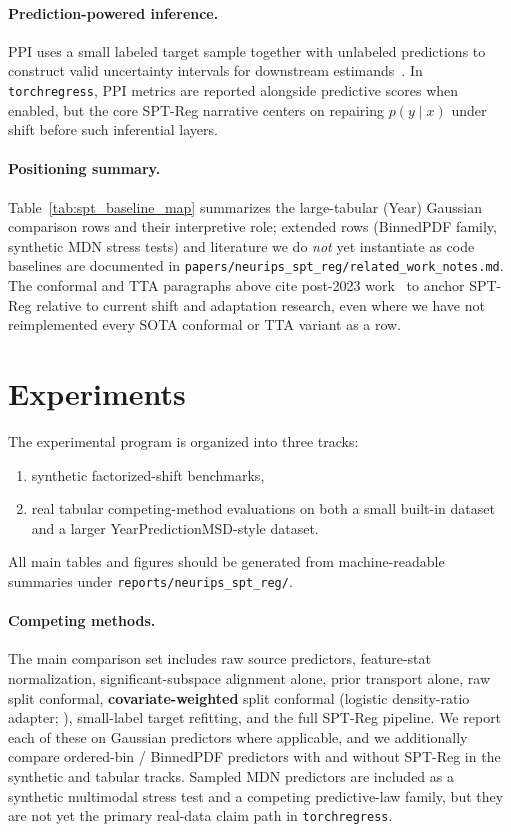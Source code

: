 \documentclass{article}
\begin{document}
\paragraph{Prediction-powered inference.}
PPI uses a small labeled target sample together with unlabeled predictions to
construct valid uncertainty intervals for downstream
estimands~\citep{chernozhukov2023ppi}. In \texttt{torchregress}, PPI metrics are
reported alongside predictive scores when enabled, but the core SPT-Reg narrative
centers on repairing $p(y \mid x)$ under shift before such inferential layers.

\paragraph{Positioning summary.}
Table~\ref{tab:spt_baseline_map} summarizes the large-tabular (Year) Gaussian
comparison rows and their interpretive role; extended rows (BinnedPDF family,
synthetic MDN stress tests) and literature we do \emph{not} yet instantiate as
code baselines are documented in
\texttt{papers/neurips\_spt\_reg/related\_work\_notes.md}.
The conformal and TTA paragraphs above cite post-2023 work~\citep{gibbs2024conformal,kim2024test}
to anchor SPT-Reg relative to current shift and adaptation research, even where
we have not reimplemented every SOTA conformal or TTA variant as a row.

\section{Experiments}

The experimental program is organized into three tracks:
\begin{enumerate}
  \item synthetic factorized-shift benchmarks,
  \item real tabular competing-method evaluations on both a small built-in
  dataset and a larger YearPredictionMSD-style dataset.
\end{enumerate}

All main tables and figures should be generated from machine-readable summaries
under \texttt{reports/neurips\_spt\_reg/}.

\paragraph{Competing methods.}
The main comparison set includes raw source predictors, feature-stat
normalization, significant-subspace alignment alone, prior transport alone,
raw split conformal, \textbf{covariate-weighted} split conformal (logistic
density-ratio adapter; \citealp{tibshirani2019conformal}), small-label target
refitting, and the full SPT-Reg
pipeline. We report each of these on Gaussian predictors where applicable, and
we additionally compare ordered-bin / BinnedPDF predictors with and without
SPT-Reg in the synthetic and tabular tracks. Sampled MDN predictors are
included as a synthetic multimodal stress test and a competing predictive-law
family, but they are not yet the primary real-data claim path in
\texttt{torchregress}.
\end{document}
